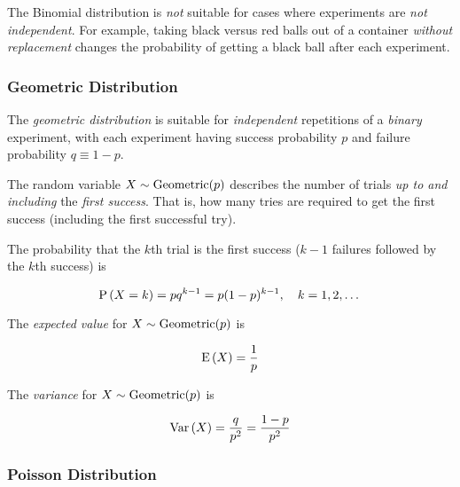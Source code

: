 \begin{remark}
    The Binomial distribution is \textit{not} suitable for cases where
    experiments are \textit{not independent}. For example, taking black versus
    red balls out of a container \textit{without replacement} changes the
    probability of getting a black ball after each experiment.
\end{remark}

\subsubsection{Geometric Distribution}

\begin{definition}
    The \textit{geometric distribution} is suitable for \textit{independent}
    repetitions of a \textit{binary} experiment, with each experiment having
    success probability $p$ and failure probability $q \equiv 1 - p$.

    The random variable $X \sim \mathrm{Geometric}(p)$ describes the number of trials
    \textit{up to and including} the \textit{first success}. That is, how many
    tries are required to get the first success (including the first successful
    try).

    The probability that the $k$th trial is the first success ($k - 1$ failures
    followed by the $k$th success) is

    \begin{equation}
        \mathrm{P} \left( X = k \right) = pq^{k - 1} = p(1-p)^{k-1}, \quad k = 1, 2, \dots
    \end{equation}

    The \textit{expected value} for $X \sim \mathrm{Geometric}(p)$ is

    \begin{equation}
        \mathrm{E} \left( X \right) = \frac{1}{p}
    \end{equation}

    The \textit{variance} for $X \sim \mathrm{Geometric}(p)$ is

    \begin{equation}
        \mathrm{Var} \left( X \right) = \frac{q}{p^2} = \frac{1 - p}{p^2}
    \end{equation}
\end{definition}

\subsubsection{Poisson Distribution}

